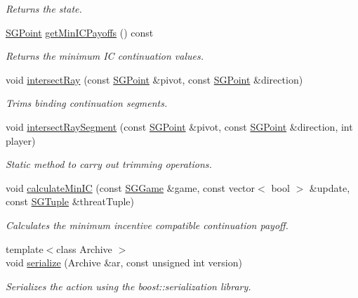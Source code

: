 \begin{DoxyCompactItemize}
\begin{DoxyCompactList}\small\item\em Returns the state. \end{DoxyCompactList}\item 
\hypertarget{classSGAction_aa3758e5365a78ee447ec41914cc7bb99}{\hyperlink{classSGPoint}{S\-G\-Point} \hyperlink{classSGAction_aa3758e5365a78ee447ec41914cc7bb99}{get\-Min\-I\-C\-Payoffs} () const }\label{classSGAction_aa3758e5365a78ee447ec41914cc7bb99}

\begin{DoxyCompactList}\small\item\em Returns the minimum I\-C continuation values. \end{DoxyCompactList}\item 
void \hyperlink{classSGAction_a7ecafdb0cf42f83931f923f2e4e23f25}{intersect\-Ray} (const \hyperlink{classSGPoint}{S\-G\-Point} \&pivot, const \hyperlink{classSGPoint}{S\-G\-Point} \&direction)
\begin{DoxyCompactList}\small\item\em Trims binding continuation segments. \end{DoxyCompactList}\item 
\hypertarget{classSGAction_ae78f31d121e131788ac4c767e01d012c}{void \hyperlink{classSGAction_ae78f31d121e131788ac4c767e01d012c}{intersect\-Ray\-Segment} (const \hyperlink{classSGPoint}{S\-G\-Point} \&pivot, const \hyperlink{classSGPoint}{S\-G\-Point} \&direction, int player)}\label{classSGAction_ae78f31d121e131788ac4c767e01d012c}

\begin{DoxyCompactList}\small\item\em Static method to carry out trimming operations. \end{DoxyCompactList}\item 
\hypertarget{classSGAction_a175b7f97c90b86d58a994eb5b42161e9}{void \hyperlink{classSGAction_a175b7f97c90b86d58a994eb5b42161e9}{calculate\-Min\-I\-C} (const \hyperlink{classSGGame}{S\-G\-Game} \&game, const vector$<$ bool $>$ \&update, const \hyperlink{classSGTuple}{S\-G\-Tuple} \&threat\-Tuple)}\label{classSGAction_a175b7f97c90b86d58a994eb5b42161e9}

\begin{DoxyCompactList}\small\item\em Calculates the minimum incentive compatible continuation payoff. \end{DoxyCompactList}\item 
\hypertarget{classSGAction_a2d1b9515be55e396e8595051ba6d3bdd}{{\footnotesize template$<$class Archive $>$ }\\void \hyperlink{classSGAction_a2d1b9515be55e396e8595051ba6d3bdd}{serialize} (Archive \&ar, const unsigned int version)}\label{classSGAction_a2d1b9515be55e396e8595051ba6d3bdd}

\begin{DoxyCompactList}\small\item\em Serializes the action using the boost\-::serialization library. \end{DoxyCompactList}\end{DoxyCompactItemize}
